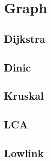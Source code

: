 \section{Graph}


\subsection{Dijkstra}


\subsection{Dinic}


\subsection{Kruskal}


\subsection{LCA}


\subsection{Lowlink}

